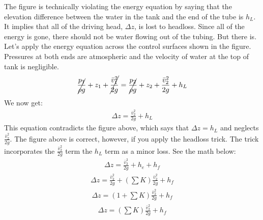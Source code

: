 \documentclass[letterpaper,10pt,english]{sphinxmanual}
\begin{document}
The figure is technically violating the energy equation by saying that the elevation difference between the water in the tank and the end of the tube is \(h_L\). It implies that all of the driving head, \(\Delta z\), is lost to headloss. Since all of the energy is gone, there should not be water flowing out of the tubing. But there is. Let’s apply the energy equation across the control surfaces shown in the figure. Pressures at both ends are atmospheric and the velocity of water at the top of tank is negligible.
\begin{equation}\label{equation:Fluids_Review/Fluids_Review_Design:Fluids_Review/Fluids_Review_Design:22}
\begin{split}\cancel{ \frac{p_{1}}{\rho g} } + z_{1} + \cancel{ \frac{\bar v_{1}^2}{2g} } = \cancel{ \frac{p_{2}}{\rho g} } + z_{2} + \frac{\bar v_{2}^2}{2g} + h_L\end{split}
\end{equation}
We now get:
\begin{equation}\label{equation:Fluids_Review/Fluids_Review_Design:Fluids_Review/Fluids_Review_Design:23}
\begin{split}\Delta z = \frac{\bar v_2^2}{2g} + h_L\end{split}
\end{equation}
This equation contradicts the figure above, which says that \(\Delta z = h_L\) and neglects \(\frac{\bar v_2^2}{2g}\). The figure above is correct, however, if you apply the headloss trick. The trick incorporates the \(\frac{\bar v_2^2}{2g}\) term  the \(h_L\) term as a minor loss. See the math below:
\begin{equation}\label{equation:Fluids_Review/Fluids_Review_Design:Fluids_Review/Fluids_Review_Design:24}
\begin{split}\Delta z = \frac{\bar v_2^2}{2g} + h_e + h_f\end{split}
\end{equation}\begin{equation}\label{equation:Fluids_Review/Fluids_Review_Design:Fluids_Review/Fluids_Review_Design:25}
\begin{split}\Delta z = \frac{\bar v_2^2}{2g} + \left( \sum K \right) \frac{\bar v_2^2}{2g} + h_f\end{split}
\end{equation}\begin{equation}\label{equation:Fluids_Review/Fluids_Review_Design:Fluids_Review/Fluids_Review_Design:26}
\begin{split}\Delta z = \left( 1 + \sum K \right) \frac{\bar v_2^2}{2g} + h_f\end{split}
\end{equation}\begin{equation}\label{equation:Fluids_Review/Fluids_Review_Design:Fluids_Review/Fluids_Review_Design:27}
\begin{split}\Delta z = \left( \sum K \right) \frac{\bar v_2^2}{2g} + h_f\end{split}
\end{equation}
\end{document}
